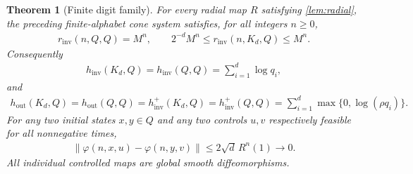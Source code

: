 \documentclass[11pt,a4paper]{article}
\newtheorem{theorem}{Theorem}[section]
\theoremstyle{definition}
\theoremstyle{remark}
\begin{document}
\begin{theorem}[Finite digit family]\label{thm:digits}
For every radial map \(R\) satisfying \cref{lem:radial}, the preceding finite-alphabet cone system satisfies, for all integers \(n\geq0\),
\begin{align}\label{eq:digit-counts}
 r_{\mathrm{inv}}(n,Q,Q)=M^n,\qquad
 2^{-d}M^n\leq r_{\mathrm{inv}}(n,K_d,Q)\leq M^n.
\end{align}
Consequently
\begin{align*}
 h_{\mathrm{inv}}(K_d,Q)=h_{\mathrm{inv}}(Q,Q)=\sum_{i=1}^d\log q_i,
\end{align*}
and
\begin{align}\label{eq:digit-outer}
 h_{\mathrm{out}}(K_d,Q)=h_{\mathrm{out}}(Q,Q)
 =h_{\mathrm{inv}}^{+}(K_d,Q)=h_{\mathrm{inv}}^{+}(Q,Q)
 =\sum_{i=1}^d\max\{0,\log(\rho q_i)\}.
\end{align}
For any two initial states \(x,y\in Q\) and any two controls \(u,v\) respectively feasible for all nonnegative times,
\begin{align}\label{eq:uniform-digit}
 \left\lVert \varphi(n,x,u)-\varphi(n,y,v)\right\rVert
 \leq 2\sqrt d\,R^n(1)\longrightarrow0.
\end{align}
All individual controlled maps are global smooth diffeomorphisms.
\end{theorem}
\end{document}
